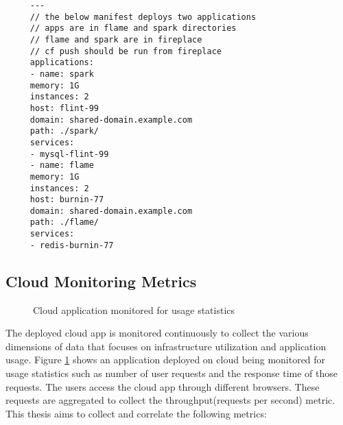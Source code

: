 \documentclass[article,type=msc,colorback,12pt,accentcolor=tud8b,table]{tudthesis}
\begin{document}
	 \begin{lstlisting}	
	 ---
	 // the below manifest deploys two applications
	 // apps are in flame and spark directories
	 // flame and spark are in fireplace
	 // cf push should be run from fireplace
	 applications:
	 - name: spark
	 memory: 1G
	 instances: 2
	 host: flint-99
	 domain: shared-domain.example.com
	 path: ./spark/
	 services:
	 - mysql-flint-99
	 - name: flame
	 memory: 1G
	 instances: 2
	 host: burnin-77
	 domain: shared-domain.example.com
	 path: ./flame/
	 services:
	 - redis-burnin-77
	 \end{lstlisting}
	
\subsection{Cloud Monitoring Metrics} 
	
 \begin{figure}[!h]
 	\begin{center}
 		\makebox[\textwidth]{\texttt{[image: 4-1]}}
 	\end{center}
 	\caption{Cloud application monitored for usage statistics}
 	\label{fig:cloud_app_monitored}
  \end{figure}	
	
The deployed cloud app is monitored continuously to collect the various dimensions of data that focuses on infrastructure utilization and application usage. Figure \ref{fig:cloud_app_monitored} shows an application deployed on cloud being monitored for usage statistics such as number of user requests and the response time of those requests. The users access the cloud app through different browsers. These requests are aggregated to collect the throughput(requests per second) metric. This thesis aims to collect and correlate the following metrics:
\end{document}
